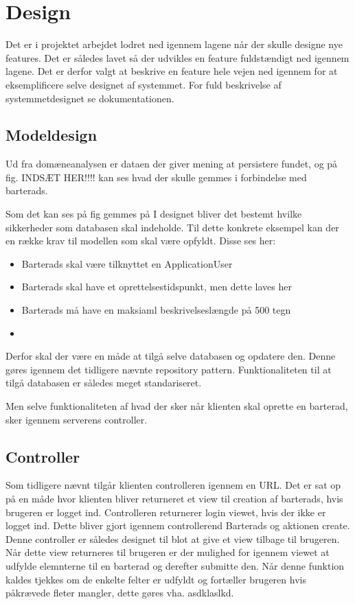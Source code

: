 \chapter{Design}

Det er i projektet arbejdet lodret ned igennem lagene når der skulle designe nye features. Det er således lavet så der udvikles en feature fuldstændigt ned igennem lagene. Det er derfor valgt at beskrive en feature hele vejen ned igennem for at eksemplificere selve designet af systemmet. For fuld beskrivelse af systemmetdesignet se dokumentationen. 

\section{Modeldesign}

Ud fra domæneanalysen er dataen der giver mening at persistere fundet, og på fig. INDSÆT HER!!!! kan ses hvad der skulle gemmes i forbindelse med barterads.



Som det kan ses på fig gemmes på 
I designet bliver det bestemt hvilke sikkerheder som databasen skal indeholde. Til dette konkrete eksempel kan der en række krav til modellen som skal være opfyldt. Disse ses her:

\begin{itemize}
	\item Barterads skal være tilknyttet en ApplicationUser
	\item Barterads skal have et oprettelsestidspunkt, men dette laves her
	\item Barterads må have en maksiaml beskrivelseslængde på 500 tegn
	\item 
\end{itemize}
Derfor skal der være en måde at tilgå selve databasen og opdatere den. Denne gøres igennem det tidligere nævnte repository pattern. Funktionaliteten til at tilgå databasen er således meget standariseret. 

Men selve funktionaliteten af hvad der sker når klienten skal oprette en barterad, sker igennem serverens controller. 

\section{Controller}  

Som tidligere nævnt tilgår klienten controlleren igennem en URL. Det er sat op på en måde hvor klienten bliver returneret et view til creation af barterads, hvis brugeren er logget ind. Controlleren returnerer login viewet, hvis der ikke er logget ind. Dette bliver gjort igennem controllerend Barterads og aktionen create. Denne controller er således designet til blot at give et view tilbage til brugeren. Når dette view returneres til brugeren er der mulighed for igennem viewet at udfylde elemnterne til en barterad og derefter submitte den. Når denne funktion kaldes tjekkes om de enkelte felter er udfyldt og fortæller brugeren hvis påkrævede fleter mangler, dette gøres vha. asdklaslkd.      

